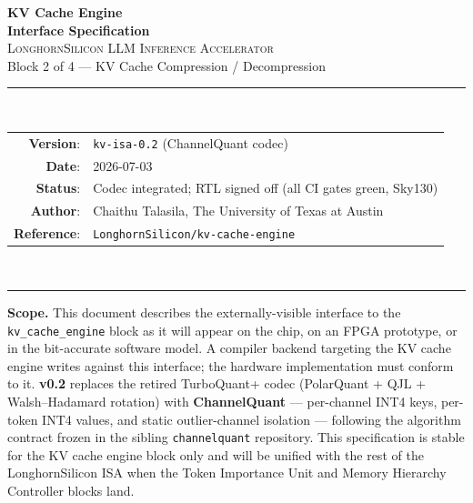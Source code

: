 \documentclass[11pt]{article}
\begin{document}
\thispagestyle{empty}
\begin{center}
\vspace*{1.2in}
{\Huge\bfseries KV Cache Engine}\\[0.4em]
{\LARGE\bfseries Interface Specification}\\[1.2em]

{\large \textsc{LonghornSilicon LLM Inference Accelerator}}\\[0.4em]
{\large Block 2 of 4 --- KV Cache Compression / Decompression}\\[2em]

\rule{0.7\textwidth}{0.4pt}\\[1em]

\begin{tabular}{rl}
\textbf{Version}:    & \texttt{kv-isa-0.2} (ChannelQuant codec) \\
\textbf{Date}:       & 2026-07-03 \\
\textbf{Status}:     & Codec integrated; RTL signed off (all CI gates green, Sky130) \\
\textbf{Author}:     & Chaithu Talasila, The University of Texas at Austin \\
\textbf{Reference}:  & \texttt{LonghornSilicon/kv-cache-engine} \\
\end{tabular}\\[1em]
\rule{0.7\textwidth}{0.4pt}

\vfill
\begin{minipage}{0.85\textwidth}
\small
\textbf{Scope.} This document describes the externally-visible interface to the
\texttt{kv\_cache\_engine} block as it will appear on the chip, on an
FPGA prototype, or in the bit-accurate software model.
A compiler backend targeting the KV cache engine writes against this
interface; the hardware implementation must conform to it. \textbf{v0.2} replaces
the retired TurboQuant+ codec (PolarQuant + QJL + Walsh--Hadamard rotation) with
\textbf{ChannelQuant} --- per-channel INT4 keys, per-token INT4 values, and static
outlier-channel isolation --- following the algorithm contract frozen in the
sibling \texttt{channelquant} repository. This specification is stable for the
KV cache engine block only and will be unified with the rest of the LonghornSilicon
ISA when the Token Importance Unit and Memory Hierarchy Controller blocks land.
\end{minipage}

\vspace{0.3in}
\end{center}
\end{document}
